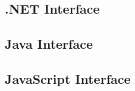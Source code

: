 \documentclass{book}
\begin{document}
\begin{dotnetcpdflib}
\clearpage
\section*{.NET Interface}
\begin{small}\tt

\end{small}
\end{dotnetcpdflib}

\begin{jcpdflib}
\clearpage
\section*{Java Interface}
\begin{small}\tt

\end{small}
\end{jcpdflib}

\begin{jscpdflib}
\clearpage
\section*{JavaScript Interface}
\begin{small}\tt

\end{small}
\end{jscpdflib}
\end{document}
